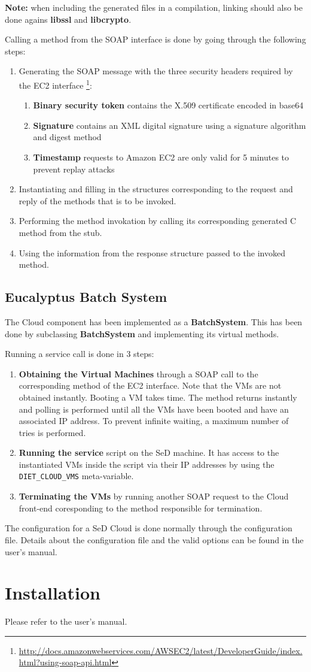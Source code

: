 \textbf{Note:} when including the generated files in a compilation, linking should also be done agains
\textbf{libssl} and \textbf{libcrypto}.

Calling a method from the SOAP interface is done by going through the following steps:
\begin{enumerate}
\item Generating the SOAP message with the three security headers required by the EC2 interface
\footnote{\url{http://docs.amazonwebservices.com/AWSEC2/latest/DeveloperGuide/index.html?using-soap-api.html}}:
\begin{enumerate}
\item \textbf{Binary security token} contains the X.509 certificate encoded in base64
\item \textbf{Signature} contains an XML digital signature using a signature algorithm and digest method
\item \textbf{Timestamp} requests to Amazon EC2 are only valid for 5 minutes to prevent replay attacks
\end{enumerate}
\item Instantiating and filling in the structures corresponding to the request and reply of the methods that is to be invoked.
\item Performing the method invokation by calling its corresponding generated C method from the stub.
\item Using the information from the response structure passed to the invoked method.
\end{enumerate}

\subsection{Eucalyptus Batch System}

The Cloud component has been implemented as a \textbf{BatchSystem}. This has been done by subclassing
\textbf{BatchSystem} and implementing its virtual methods.

Running a service call is done in 3 steps:
\begin{enumerate}
\item \textbf{Obtaining the Virtual Machines} through a SOAP call to the corresponding method of the EC2
interface. Note that the VMs are not obtained instantly. Booting a VM takes time. The method returns
instantly and polling is performed until all the VMs have been booted and have an associated IP address.
To prevent infinite waiting, a maximum number of tries is performed.
\item \textbf{Running the service} script on the SeD machine. It has access to the instantiated VMs
inside the script via their IP addresses by using the \verb!DIET_CLOUD_VMS! meta-variable.
\item \textbf{Terminating the VMs} by running another SOAP request to the Cloud front-end coresponding
to the method responsible for termination.
\end{enumerate}

The configuration for a SeD Cloud is done normally through the configuration file. Details about
the configuration file and the valid options can be found in the user's manual.

\section{Installation}

Please refer to the user's manual.


